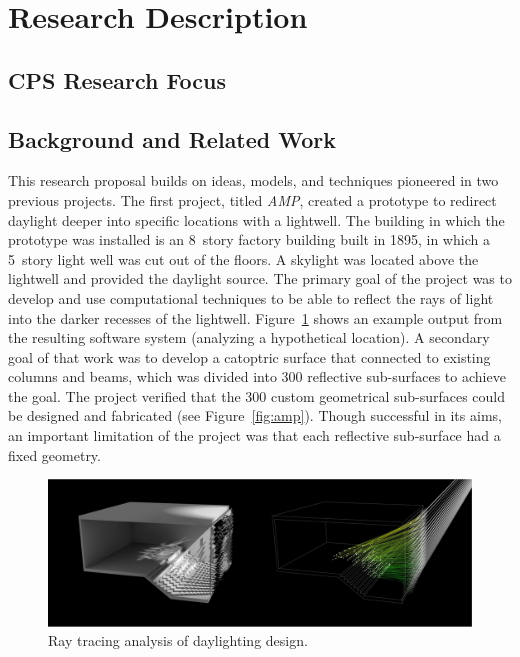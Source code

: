 \section{Research Description}
\label{sec:research}

\subsection{CPS Research Focus}


\subsection{Background and Related Work}
\label{sec:background}


This research proposal builds on ideas, models, and techniques pioneered in two 
previous projects.
The first project, titled \emph{AMP}, created a prototype to redirect
daylight deeper into specific locations with a lightwell.
The building in which the prototype was installed is an 8~story factory
building built in 1895, in which a 5~story light well was cut out of
the floors. A skylight was located above the lightwell and provided the
daylight source.  The primary goal of the project was to develop and use
computational techniques to be able to reflect the rays of light into
the darker recesses of the lightwell. 
Figure~\ref{fig:raytracing} shows an example output from the resulting software
system (analyzing a hypothetical location).
A secondary goal of that work was to develop
a catoptric surface that connected to existing columns and beams, which was
divided into 300 reflective sub-surfaces to achieve the goal.
The project verified that the 300 custom geometrical sub-surfaces
could be designed and fabricated (see Figure~\ref{fig:amp}).
Though successful in its aims, an important limitation of the project
was that each reflective sub-surface had a fixed geometry.

\begin{figure}[ht]
\centering
\includegraphics[width=0.95\linewidth]{figures/raytracing}
\caption{Ray tracing analysis of daylighting design.}
\label{fig:raytracing}
\end{figure}


